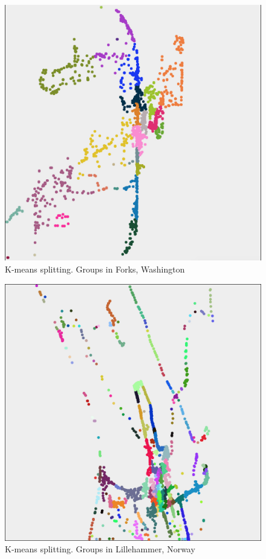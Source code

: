 \begin{figure}[h]
	\center
	\includegraphics[scale=0.35]{Images/computations/KMEANSForks.jpg}
	\caption{K-means splitting. Groups in Forks, Washington}
	\label{fig:kmeans_forks}
\end{figure}

\begin{figure}[h]
	\center
	\includegraphics[scale=0.35]{Images/computations/KMEANSLillehammer.jpg}
	\caption{K-means splitting. Groups in Lillehammer, Norway}
	\label{fig:kmeans_forks}
\end{figure}


